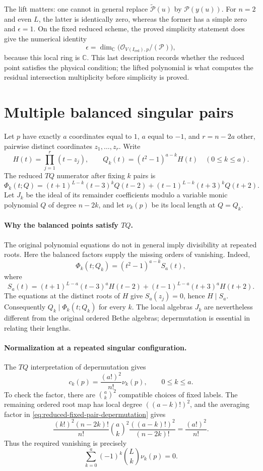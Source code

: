 \documentclass[11pt]{article}
\theoremstyle{definition}
\newcommand{\C}{\mathbb C}
\begin{document}
The lift matters: one cannot in general replace
$\widetilde{\mathcal P}(u)$ by $\mathcal P(y(u))$. For $n=2$
and even $L$, the latter is identically zero, whereas the former
has a simple zero and $\epsilon=1$. On the fixed reduced scheme,
the proved simplicity statement does give the numerical identity
\[
 \epsilon=\dim_\C
 \bigl(\mathcal O_{V(I_{\mathrm{red}}),p}/(\mathcal P)\bigr),
\]
because this local ring is $\C$. This last description records
whether the reduced point satisfies the physical condition; the
lifted polynomial is what computes the residual intersection
multiplicity before simplicity is proved.

\section{Multiple balanced singular pairs}
\label{sec:multiple-balanced-pairs}

Let $p$ have exactly $a$ coordinates equal to $1$, $a$ equal to $-1$,
and $r=n-2a$ other, pairwise distinct coordinates $z_1,\ldots,z_r$.
Write
\[
 H(t)=\prod_{j=1}^r(t-z_j),\qquad
 Q_k(t)=(t^2-1)^{a-k}H(t)\quad(0\le k\le a).
\]
The reduced $TQ$ numerator after fixing $k$ pairs is
\[
 \Phi_k(t;Q)=(t+1)^{L-k}(t-3)^kQ(t-2)
             +(t-1)^{L-k}(t+3)^kQ(t+2).
\]
Let $J_k$ be the ideal of its remainder coefficients modulo a variable
monic polynomial $Q$ of degree $n-2k$, and let $\nu_k(p)$ be its local
length at $Q=Q_k$.

\paragraph{Why the balanced points satisfy $TQ$.}
The original polynomial equations do not in general imply divisibility
at repeated roots. Here the balanced factors supply the missing
orders of vanishing. Indeed,
\[
 \Phi_k(t;Q_k)=(t^2-1)^{a-k}S_a(t),
\]
where
\[
 S_a(t)=(t+1)^{L-a}(t-3)^aH(t-2)
        +(t-1)^{L-a}(t+3)^aH(t+2).
\]
The equations at the distinct roots of $H$ give $S_a(z_j)=0$, hence
$H\mid S_a$. Consequently $Q_k\mid\Phi_k(t;Q_k)$ for every $k$.
The local algebras $J_k$ are nevertheless different from the original
ordered Bethe algebras; depermutation is essential in relating their
lengths.

\paragraph{Normalization at a repeated singular configuration.}
The $TQ$ interpretation of depermutation gives
\begin{equation}\label{eq:balanced-local-normalization}
 c_k(p)=\frac{(a!)^2}{n!}\nu_k(p),\qquad 0\le k\le a.
\end{equation}
To check the factor, there are $\binom ak^2$ compatible choices of
fixed labels. The remaining ordered root map has local degree
$((a-k)!)^2$, and the averaging factor in
\eqref{eq:reduced-fixed-pair-depermutation} gives
\[
 \frac{(k!)^2(n-2k)!}{n!}\binom ak^2
 \frac{((a-k)!)^2}{(n-2k)!}=\frac{(a!)^2}{n!}.
\]
Thus the required vanishing is precisely
\begin{equation}\label{eq:balanced-remainder-length-identity}
 \sum_{k=0}^a(-1)^k\binom Lk\nu_k(p)=0.
\end{equation}
\end{document}
